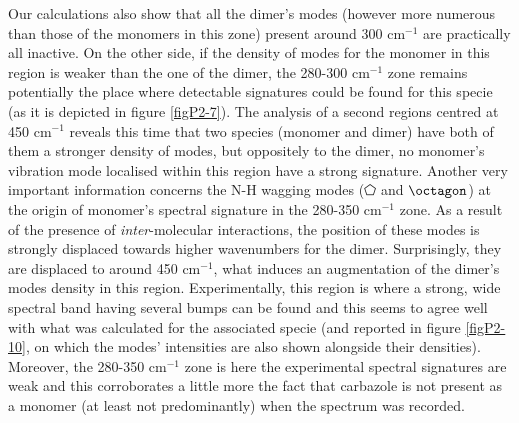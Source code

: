 	
	Our calculations also show that all the dimer’s modes (however more numerous than those of the monomers in this zone) present around 300 cm$^{-1}$ are practically all inactive. On the other side, if the density of modes for the monomer in this region is weaker than the one of the dimer, the 280-300 cm$^{-1}$ zone remains potentially the place where detectable signatures could be found for this specie (as it is depicted in figure \ref{figP2-7}). The analysis of a second regions centred at 450 cm$^{-1}$ reveals this time that two species (monomer and dimer) have both of them a stronger density of modes, but oppositely to the dimer, no monomer’s vibration mode localised within this region have a strong signature. Another very important information concerns the N-H wagging modes ($\pentagon$ and $\octagon$)
	  at the origin of monomer’s spectral signature in the 280-350 cm$^{-1}$ zone. As a result of the presence of \textit{inter}-molecular interactions, the position of these modes is strongly displaced towards higher wavenumbers for the dimer. Surprisingly, they are displaced to around 450 cm$^{-1}$, what induces an augmentation of the dimer’s modes density in this region. Experimentally, this region is where a strong, wide spectral band having several bumps can be found and this seems to agree well with what was calculated for the associated specie (and reported in figure \ref{figP2-10}, on which the modes’ intensities are also shown alongside their densities). Moreover, the 280-350 cm$^{-1}$ zone is here the experimental spectral signatures are weak and this corroborates a little more the fact that carbazole is not present as a monomer (at least not predominantly)  when the spectrum was recorded.
	 
